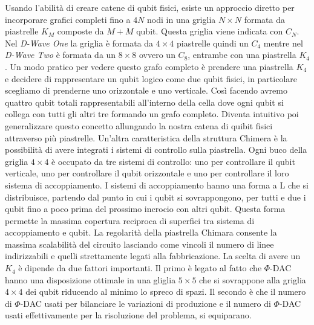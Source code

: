 Usando l'abilità di creare catene di qubit fisici, esiste un approccio diretto per incorporare grafici completi fino a $4N$ nodi in una griglia $N \times N$ formata da piastrelle $K_M$ composte da $M + M$ qubit. Questa griglia viene indicata con $C_N$. Nel \textit{D-Wave One} la griglia è formata da $4\times4$ piastrelle quindi un $C_4$ mentre nel \textit{D-Wave Two} è formata da un $8\times8$ ovvero un $C_8$, entrambe con una piastrella $K_4$. Un modo pratico per vedere questo grafo completo è prendere una piastrella $K_4$ e decidere di rappresentare un qubit logico come due qubit fisici, in particolare scegliamo di prenderne uno orizzontale e uno verticale. Così facendo avremo quattro qubit totali rappresentabili all'interno della cella dove ogni qubit si collega con tutti gli altri tre formando un grafo completo. Diventa intuitivo poi generalizzare questo concetto allungando la nostra catena di quibit fisici attraverso più piastrelle. Un'altra caratteristica della struttura Chimera è la possibilità di avere integrati i sistemi di controllo sulla piastrella. Ogni buco della griglia $4\times4$ è occupato da tre sistemi di controllo: uno per controllare il qubit verticale, uno per controllare il qubit orizzontale e uno per controllare il loro sistema di accoppiamento. I sistemi di accoppiamento hanno una forma a L che si distribuisce, partendo dal punto in cui i qubit si sovrappongono, per tutti e due i qubit fino a poco prima del prossimo incrocio con altri qubit. Questa forma permette la massima copertura reciproca di superfici tra sistema di accoppiamento e qubit.
La regolarità della piastrella Chimara consente la massima scalabilità del circuito lasciando come vincoli il numero di linee indirizzabili e quelli strettamente legati alla fabbricazione. La scelta di avere un $K_4$ è dipende da due fattori importanti. Il primo è legato al fatto che $\Phi$-DAC hanno una disposizione ottimale in una gliglia $5\times5$ che si sovrappone alla griglia $4\times4$ dei qubit riducendo al minimo lo spreco di spazi. Il secondo è che il numero di $\Phi$-DAC usati per bilanciare le variazioni di produzione e il numero di $\Phi$-DAC usati effettivamente per la risoluzione del problema, si equiparano.

